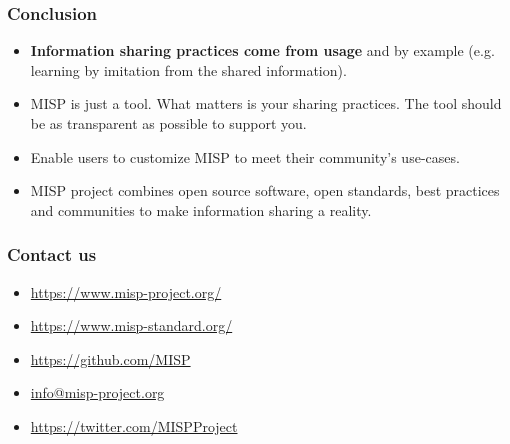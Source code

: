 \begin{frame}
        \frametitle{Conclusion}
        \begin{itemize}
                \item {\bf Information sharing practices come from usage} and by example (e.g. learning by imitation from the shared information).
                \item MISP is just a tool. What matters is your sharing practices. The tool should be as transparent as possible to support you.
                \item Enable users to customize MISP to meet their community's use-cases.
                \item MISP project combines open source software, open standards, best practices and communities to make information sharing a reality.
        \end{itemize}
\end{frame}

\begin{frame}
  \frametitle{Contact us}
  \begin{itemize}
    \item \url{https://www.misp-project.org/}
    \item \url{https://www.misp-standard.org/}
    \item \url{https://github.com/MISP}
    \item \url{info@misp-project.org}
    \item \url{https://twitter.com/MISPProject}
  \end{itemize}
\end{frame}


